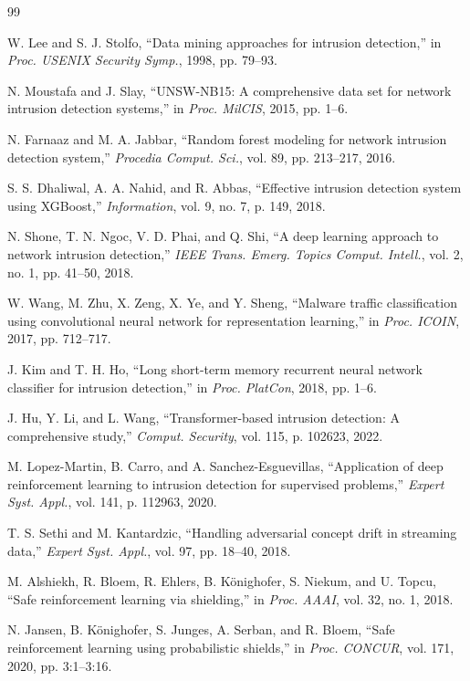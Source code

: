 \documentclass[conference]{IEEEtran}
\begin{document}
\begin{thebibliography}{99}

W. Lee and S. J. Stolfo, ``Data mining approaches for intrusion detection,'' in \emph{Proc. USENIX Security Symp.}, 1998, pp. 79--93.

N. Moustafa and J. Slay, ``UNSW-NB15: A comprehensive data set for network intrusion detection systems,'' in \emph{Proc. MilCIS}, 2015, pp. 1--6.

N. Farnaaz and M. A. Jabbar, ``Random forest modeling for network intrusion detection system,'' \emph{Procedia Comput. Sci.}, vol. 89, pp. 213--217, 2016.

S. S. Dhaliwal, A. A. Nahid, and R. Abbas, ``Effective intrusion detection system using XGBoost,'' \emph{Information}, vol. 9, no. 7, p. 149, 2018.

N. Shone, T. N. Ngoc, V. D. Phai, and Q. Shi, ``A deep learning approach to network intrusion detection,'' \emph{IEEE Trans. Emerg. Topics Comput. Intell.}, vol. 2, no. 1, pp. 41--50, 2018.

W. Wang, M. Zhu, X. Zeng, X. Ye, and Y. Sheng, ``Malware traffic classification using convolutional neural network for representation learning,'' in \emph{Proc. ICOIN}, 2017, pp. 712--717.

J. Kim and T. H. Ho, ``Long short-term memory recurrent neural network classifier for intrusion detection,'' in \emph{Proc. PlatCon}, 2018, pp. 1--6.

J. Hu, Y. Li, and L. Wang, ``Transformer-based intrusion detection: A comprehensive study,'' \emph{Comput. Security}, vol. 115, p. 102623, 2022.

M. Lopez-Martin, B. Carro, and A. Sanchez-Esguevillas, ``Application of deep reinforcement learning to intrusion detection for supervised problems,'' \emph{Expert Syst. Appl.}, vol. 141, p. 112963, 2020.

T. S. Sethi and M. Kantardzic, ``Handling adversarial concept drift in streaming data,'' \emph{Expert Syst. Appl.}, vol. 97, pp. 18--40, 2018.

M. Alshiekh, R. Bloem, R. Ehlers, B. K{\"o}nighofer, S. Niekum, and U. Topcu, ``Safe reinforcement learning via shielding,'' in \emph{Proc. AAAI}, vol. 32, no. 1, 2018.

N. Jansen, B. K{\"o}nighofer, S. Junges, A. Serban, and R. Bloem, ``Safe reinforcement learning using probabilistic shields,'' in \emph{Proc. CONCUR}, vol. 171, 2020, pp. 3:1--3:16.


\end{thebibliography}
\end{document}
